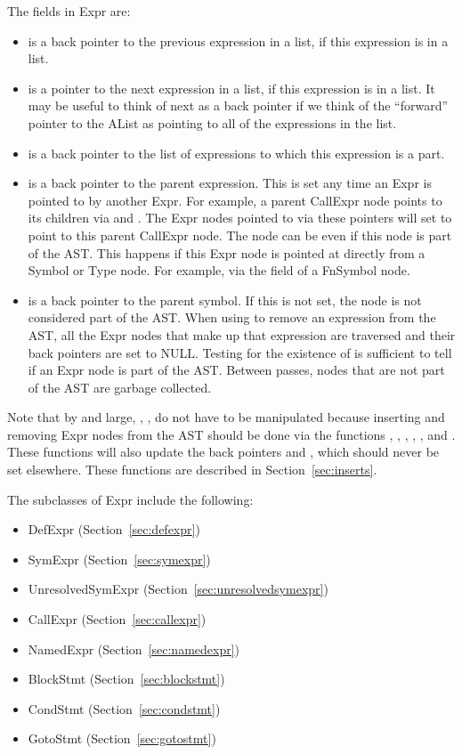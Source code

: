 \documentclass[10pt]{article}
\begin{document}
The fields in Expr are:
\begin{itemize}
\item {} is a back pointer to the previous expression in
  a list, if this expression is in a list.
\item {} is a pointer to the next expression in a list,
  if this expression is in a list.  It may be useful to think of next
  as a back pointer if we think of the ``forward'' pointer to the
  AList as pointing to all of the expressions in the list.
\item {} is a back pointer to the list of expressions to
  which this expression is a part.
\item {} is a back pointer to the parent
  expression.  This is set any time an Expr is pointed to by another
  Expr.  For example, a parent CallExpr node points to its children
  via  and .  The Expr nodes pointed to via
  these pointers will set  to point to this parent
  CallExpr node.  The  node can be  even if
  this node is part of the AST.  This happens if this Expr node is
  pointed at directly from a Symbol or Type node.  For example, via
  the  field of a FnSymbol node.
\item {} is a back pointer to the parent
  symbol.  If this is not set, the node is not considered part of the
  AST.  When using  to remove an expression from the AST,
  all the Expr nodes that make up that expression are traversed and
  their  back pointers are set to NULL.  Testing for
  the existence of  is sufficient to tell if an Expr
  node is part of the AST.  Between passes, nodes that are not part of
  the AST are garbage collected.
\end{itemize}

Note that by and large, , ,  do not have to
be manipulated because inserting and removing Expr nodes from the AST
should be done via the functions , ,
, , , and .
These functions will also update the back pointers  and
, which should never be set elsewhere.  These
functions are described in Section~\ref{sec:inserts}.

The subclasses of Expr include the following:
\begin{itemize}
\item DefExpr (Section~\ref{sec:defexpr})
\item SymExpr (Section~\ref{sec:symexpr})
\item UnresolvedSymExpr (Section~\ref{sec:unresolvedsymexpr})
\item CallExpr (Section~\ref{sec:callexpr})
\item NamedExpr (Section~\ref{sec:namedexpr})
\item BlockStmt (Section~\ref{sec:blockstmt})
\item CondStmt (Section~\ref{sec:condstmt})
\item GotoStmt (Section~\ref{sec:gotostmt})
\end{itemize}
\end{document}
